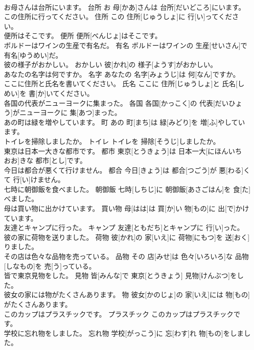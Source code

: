 \documentclass[8pt]{extreport}
\begin{document}
\begin{CJK}{UTF8}{min}
\\	お母さんは台所にいます。	台所	お 母[かあ]さんは 台所[だいどころ]にいます。	
\\	この住所に行ってください。	住所	この 住所[じゅうしょ]に 行[い]ってください。	
\\	便所はそこです。	便所	便所[べんじょ]はそこです。	
\\	ボルドーはワインの生産で有名だ。	有名	ボルドーはワインの 生産[せいさん]で 有名[ゆうめい]だ。	
\\	彼の様子がおかしい。	おかしい	彼[かれ]の 様子[ようす]がおかしい。	
\\	あなたの名字は何ですか。	名字	あなたの 名字[みょうじ]は 何[なん]ですか。	
\\	ここに住所と氏名を書いてください。	氏名	ここに 住所[じゅうしょ]と 氏名[しめい]を 書[か]いてください。	
\\	各国の代表がニューヨークに集まった。	各国	各国[かっこく]の 代表[だいひょう]がニューヨークに 集[あつ]まった。	
\\	あの町は緑を増やしています。	町	あの 町[まち]は 緑[みどり]を 増[ふ]やしています。	
\\	トイレを掃除しましたか。	トイレ	トイレを 掃除[そうじ]しましたか。	
\\	東京は日本一大きな都市です。	都市	東京[とうきょう]は 日本一大[にほんいち おお]きな 都市[とし]です。	
\\	今日は都合が悪くて行けません。	都合	今日[きょう]は 都合[つごう]が 悪[わる]くて 行[い]けません。	
\\	七時に朝御飯を食べました。	朝御飯	七時[しちじ]に 朝御飯[あさごはん]を 食[た]べました。	
\\	母は買い物に出かけています。	買い物	母[はは]は 買[か]い 物[もの]に 出[で]かけています。	
\\	友達とキャンプに行った。	キャンプ	友達[ともだち]とキャンプに 行[い]った。	
\\	彼の家に荷物を送りました。	荷物	彼[かれ]の 家[いえ]に 荷物[にもつ]を 送[おく]りました。	
\\	その店は色々な品物を売っている。	品物	その 店[みせ]は 色々[いろいろ]な 品物[しなもの]を 売[う]っている。	
\\	皆で東京見物をした。	見物	皆[みんな]で 東京[とうきょう] 見物[けんぶつ]をした。	
\\	彼女の家には物がたくさんあります。	物	彼女[かのじょ]の 家[いえ]には 物[もの]がたくさんあります。	
\\	このカップはプラスチックです。	プラスチック	このカップはプラスチックです。	
\\	学校に忘れ物をしました。	忘れ物	学校[がっこう]に 忘[わす]れ 物[もの]をしました。	

\end{CJK}
\end{document}
